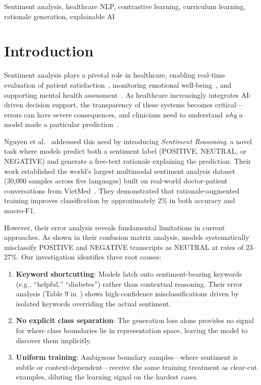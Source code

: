 \documentclass[conference]{IEEEtran}
\begin{document}
\begin{IEEEkeywords}
Sentiment analysis, healthcare NLP, contrastive learning, curriculum learning, rationale generation, explainable AI
\end{IEEEkeywords}

\section{Introduction}

Sentiment analysis plays a pivotal role in healthcare, enabling real-time evaluation of patient satisfaction~\cite{xia2009improving}, monitoring emotional well-being~\cite{cambria2012sentic}, and supporting mental health assessment~\cite{pestian2012sentiment}. As healthcare increasingly integrates AI-driven decision support, the transparency of these systems becomes critical---errors can have severe consequences, and clinicians need to understand \emph{why} a model made a particular prediction~\cite{antoniadi2021current}.

Nguyen et al.~\cite{nguyen2024sentiment} addressed this need by introducing \emph{Sentiment Reasoning}, a novel task where models predict both a sentiment label (POSITIVE, NEUTRAL, or NEGATIVE) and generate a free-text rationale explaining the prediction. Their work established the world's largest multimodal sentiment analysis dataset (30,000 samples across five languages) built on real-world doctor-patient conversations from VietMed~\cite{leduc2024vietmed}. They demonstrated that rationale-augmented training improves classification by approximately 2\% in both accuracy and macro-F1.

However, their error analysis reveals fundamental limitations in current approaches. As shown in their confusion matrix analysis, models systematically misclassify POSITIVE and NEGATIVE transcripts as NEUTRAL at rates of 23--27\%. Our investigation identifies three root causes:

\begin{enumerate}
    \item \textbf{Keyword shortcutting}: Models latch onto sentiment-bearing keywords (e.g., ``helpful,'' ``diabetes'') rather than contextual reasoning. Their error analysis (Table 9 in~\cite{nguyen2024sentiment}) shows high-confidence misclassifications driven by isolated keywords overriding the actual sentiment.
    \item \textbf{No explicit class separation}: The generation loss alone provides no signal for where class boundaries lie in representation space, leaving the model to discover them implicitly.
    \item \textbf{Uniform training}: Ambiguous boundary samples---where sentiment is subtle or context-dependent---receive the same training treatment as clear-cut examples, diluting the learning signal on the hardest cases.
\end{enumerate}
\end{document}
